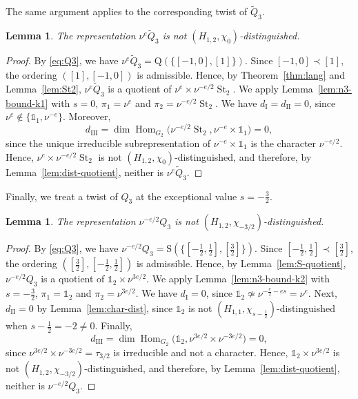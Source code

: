 \documentclass[11pt]{amsart}
\numberwithin{equation}{section}
\theoremstyle{plain}
\newtheorem{lemma}[theorem]{Lemma}
\theoremstyle{definition}
\theoremstyle{remark}
\newcommand{\one}{\mathds{1}}
\DeclareMathOperator{\Hom}{Hom}
\DeclareMathOperator{\St}{St}
\newcommand{\Qt}{\widetilde{Q}}
\newcommand{\Ss}{\mathrm{S}}
\newcommand{\Qq}{\mathrm{Q}}
\newcommand{\dI}{d_{\mathrm{I}}}
\newcommand{\dII}{d_{\mathrm{II}}}
\newcommand{\dIII}{d_{\mathrm{III}}}
\begin{document}
The same argument applies to the corresponding twist of $\Qt_3$.

\begin{lemma}\label{lem:n3-Qt3-s0}
	The representation $\nu^{e}\Qt_3$ is not $(H_{1,2},\chi_0)$-distinguished.
\end{lemma}

\begin{proof}
	By \eqref{eq:Q3}, we have $\nu^e\Qt_3=\Qq(\{[-1,0],[1]\})$. Since $[-1,0]\prec[1]$, the ordering $([1],[-1,0])$ is admissible. Hence, by Theorem~\ref{thm:lang} and Lemma~\ref{lem:St2}, $\nu^e\Qt_3$ is a quotient of $\nu^e\times\nu^{-e/2}\St_2$. We apply Lemma~\ref{lem:n3-bound-k1} with $s=0$, $\pi_1=\nu^e$ and $\pi_2=\nu^{-e/2}\St_2$. We have $\dI=\dII=0$, since $\nu^e\notin\{\one_1,\nu^{-e}\}$. Moreover,
	$$
	\dIII=\dim\Hom_{G_2}\big(\nu^{-e/2}\St_2,\nu^{-e}\times\one_1\big)=0,$$
	since the unique irreducible subrepresentation of $\nu^{-e}\times\one_1$ is the character $\nu^{-e/2}$. Hence, $\nu^e\times\nu^{-e/2}\St_2$ is not $(H_{1,2},\chi_0)$-distinguished, and therefore, by Lemma~\ref{lem:dist-quotient}, neither is $\nu^e\Qt_3$.
\end{proof}

Finally, we treat a twist of $Q_3$ at the exceptional value $s=-\frac32$.

\begin{lemma}\label{lem:n3-Q3-s-32}
	The representation $\nu^{-e/2}Q_3$ is not $(H_{1,2},\chi_{-3/2})$-distinguished.
\end{lemma}

\begin{proof}
	By \eqref{eq:Q3}, we have $\nu^{-e/2}Q_3=\Ss(\{[-\frac12,\frac12],[\frac32]\})$. Since $[-\frac12,\frac12]\prec[\frac32]$, the ordering $([\frac32],[-\frac12,\frac12])$ is admissible. Hence, by Lemma~\ref{lem:S-quotient}, $\nu^{-e/2}Q_3$ is a quotient of $\one_2\times\nu^{3e/2}$. We apply Lemma~\ref{lem:n3-bound-k2} with $s=-\frac32$, $\pi_1=\one_2$ and $\pi_2=\nu^{3e/2}$. We have $\dI=0$, since $\one_2\not\simeq\nu^{-\frac e2-es}=\nu^{e}$. Next, $\dII=0$ by Lemma~\ref{lem:char-dist}, since $\one_2$ is not $(H_{1,1},\chi_{s-\frac12})$-distinguished when $s-\frac12=-2\ne0$. Finally,
	$$
	\dIII=\dim\Hom_{G_2}\big(\one_2,\nu^{3e/2}\times\nu^{-3e/2}\big)=0,$$
	since $\nu^{3e/2}\times\nu^{-3e/2}=\tau_{3/2}$ is irreducible and not a character. Hence, $\one_2\times\nu^{3e/2}$ is not $(H_{1,2},\chi_{-3/2})$-distinguished, and therefore, by Lemma~\ref{lem:dist-quotient}, neither is $\nu^{-e/2}Q_3$.
\end{proof}
\end{document}
